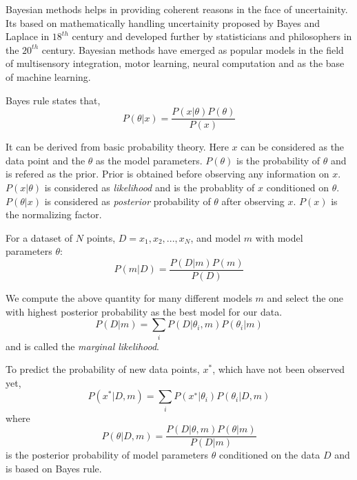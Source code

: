 % 
% 
% 

Bayesian methods helps in providing coherent reasons in the face of uncertainity. Its based 
on mathematically handling uncertainity proposed by Bayes and Laplace in $18^{th}$ century and 
developed further by statisticians and philosophers in the $20^{th}$ century. Bayesian methods
have emerged as popular models in the field of multisensory integration, motor learning, 
neural computation and as the base of machine learning. 

Bayes rule states that,
\begin{equation}
P(\theta | x) = \frac{P(x|\theta) P(\theta)}{P(x)}
\end{equation}

It can be derived from basic probability theory. Here $x$ can be considered as the data point 
and the $\theta$ as the model parameters. $P(\theta)$ is the probability of $\theta$ and is 
refered as the prior. Prior is obtained before observing any information on $x$. $P(x|\theta)$ is
considered as \textit{likelihood} and is the probablity of $x$ conditioned on $\theta$. $P(\theta|x)$
is considered as \textit{posterior} probability of $\theta$ after observing $x$. $P(x)$ is the
normalizing factor.

For a dataset of $N$ points, $D = {x_1, x_2, . . . , x_N}$, and model $m$ with model parameters 
$\theta$:
\begin{equation}
    P(m|D) = \frac{P(D|m) P(m)}{P(D)}
\end{equation}

We compute the above quantity for many different models $m$ and select the one with highest 
posterior probability as the best model for our data. 
\begin{equation}
    P(D|m) = \sum_i{P(D|\theta_i, m)P(\theta_i|m)}
\end{equation}
and is called the \textit{marginal likelihood}.

To predict the probability of new data points, $x^*$, which have not been observed yet,
\begin{equation}
    P(x^*|D, m) = \sum_i{ P(x^∗|\theta_i)P(\theta_i|D, m)}
\end{equation}
where
\begin{equation}
    P(\theta|D,m) = \frac{P(D|\theta, m)P(\theta|m)}{P(D|m)}
\end{equation}
is the posterior probability of model parameters $\theta$ conditioned on the data $D$ and is
based on Bayes rule.
